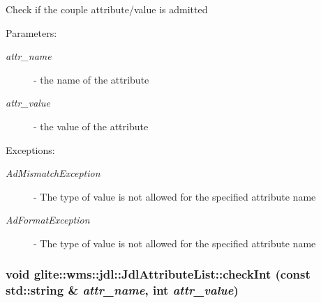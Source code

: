 Check if the couple attribute/value is admitted \begin{Desc}
\item[Parameters:]
\begin{description}
\item[{\em attr\_\-name}]- the name of the attribute \item[{\em attr\_\-value}]- the value of the attribute \end{description}
\end{Desc}
\begin{Desc}
\item[Exceptions:]
\begin{description}
\item[{\em Ad\-Mismatch\-Exception}]- The type of value is not allowed for the specified attribute name \item[{\em Ad\-Format\-Exception}]- The type of value is not allowed for the specified attribute name \end{description}
\end{Desc}
\hypertarget{classglite_1_1wms_1_1jdl_1_1JdlAttributeList_z25_1}{
\subsubsection[checkInt]{\setlength{\rightskip}{0pt plus 5cm}void glite::wms::jdl::Jdl\-Attribute\-List::check\-Int (const std::string \& {\em attr\_\-name}, int {\em attr\_\-value})}}
\label{classglite_1_1wms_1_1jdl_1_1JdlAttributeList_z25_1}


